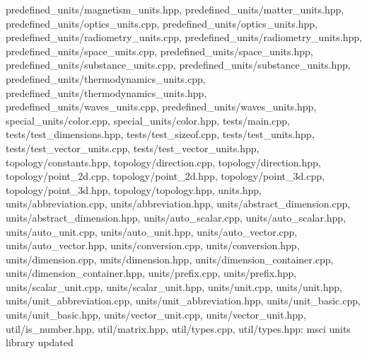 \begin{DoxyVerb}
predefined_units/magnetism_units.hpp,
predefined_units/matter_units.hpp,
predefined_units/optics_units.cpp,
predefined_units/optics_units.hpp,
predefined_units/radiometry_units.cpp,
predefined_units/radiometry_units.hpp,
predefined_units/space_units.cpp, predefined_units/space_units.hpp,
predefined_units/substance_units.cpp,
predefined_units/substance_units.hpp,
predefined_units/thermodynamics_units.cpp,
predefined_units/thermodynamics_units.hpp,
predefined_units/waves_units.cpp, predefined_units/waves_units.hpp,
special_units/color.cpp, special_units/color.hpp, tests/main.cpp,
tests/test_dimensions.hpp, tests/test_sizeof.cpp,
tests/test_units.hpp, tests/test_vector_units.cpp,
tests/test_vector_units.hpp, topology/constants.hpp,
topology/direction.cpp, topology/direction.hpp,
topology/point_2d.cpp, topology/point_2d.hpp,
topology/point_3d.cpp, topology/point_3d.hpp,
topology/topology.hpp, units.hpp, units/abbreviation.cpp,
units/abbreviation.hpp, units/abstract_dimension.cpp,
units/abstract_dimension.hpp, units/auto_scalar.cpp,
units/auto_scalar.hpp, units/auto_unit.cpp, units/auto_unit.hpp,
units/auto_vector.cpp, units/auto_vector.hpp, units/conversion.cpp,
units/conversion.hpp, units/dimension.cpp, units/dimension.hpp,
units/dimension_container.cpp, units/dimension_container.hpp,
units/prefix.cpp, units/prefix.hpp, units/scalar_unit.cpp,
units/scalar_unit.hpp, units/unit.cpp, units/unit.hpp,
units/unit_abbreviation.cpp, units/unit_abbreviation.hpp,
units/unit_basic.cpp, units/unit_basic.hpp, units/vector_unit.cpp,
units/vector_unit.hpp, util/is_number.hpp, util/matrix.hpp,
util/types.cpp, util/types.hpp: msci units library updated
\end{DoxyVerb}

